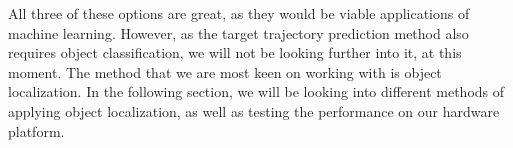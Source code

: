 All three of these options are great, as they would be viable applications of machine learning.
However, as the target trajectory prediction method also requires object classification, we will not be looking further into it, at this moment.
The method that we are most keen on working with is object localization.
In the following section, we will be looking into different methods of applying object localization, as well as testing the performance on our hardware platform.
